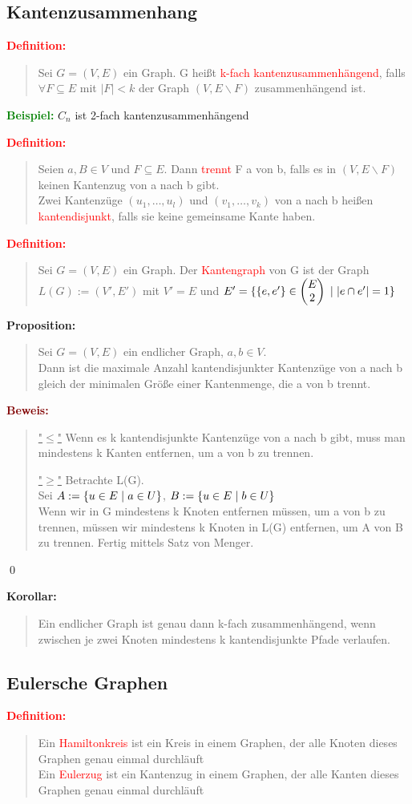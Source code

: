 \documentclass{article}
\newcommand{\smsp}{\phantom{\hspace{3px}}}
\newcommand{\red}[1]{\textcolor{red}{#1}}
\newcommand{\green}[1]{\textcolor{green}{#1}}
\newcommand{\dgr}[1]{\textcolor{dgr}{#1}}
\newcommand{\maroon}[1]{\textcolor{maroon}{#1}}
\newcommand{\ex}{\green{\textbf{Beispiel: }}}
\newcommand{\de}[1]{\red{\textbf{Definition: }}\begin{quote}#1\end{quote}}
\newcommand{\prop}[1]{\dgr{\textbf{Proposition: }}\begin{quote}#1\end{quote}}
\newcommand{\co}[1]{\dgr{\textbf{Korollar: }}\begin{quote}#1\end{quote}}
\newcommand{\pr}[1]{\maroon{\textbf{Beweis: }}\begin{quote}#1\end{quote}\qed}
\renewcommand{\st}{\smsp | \smsp}
\newcommand{\vvec}[2]{\begin{pmatrix}#1\\#2\end{pmatrix}}
\newcommand{\bs}{\backslash}
\begin{document}
\subsection{Kantenzusammenhang}

\de{
    Sei $G=(V,E)$ ein Graph. G heißt \red{k-fach kantenzusammenhängend}, falls $\forall F \subseteq E$ mit $|F| < k$ der Graph $(V, E \bs F)$ zusammenhängend ist.
}

\ex $C_n$ ist 2-fach kantenzusammenhängend

\newpage
\de{
    Seien $a,B \in V$ und $F \subseteq E$. Dann \red{trennt} F a von b, falls es in $(V, E \bs F)$ keinen Kantenzug von a nach b gibt.\\
    Zwei Kantenzüge $(u_1, \dots, u_l)$ und $(v_1, \dots, v_k)$ von a nach b heißen \red{kantendisjunkt}, falls sie keine gemeinsame Kante haben.
}

\de{
    Sei $G=(V,E)$ ein Graph. Der \red{Kantengraph} von G ist der Graph $L(G) := (V',E')$ mit $V' = E$ und $E' = \{\{e,e'\} \in \vvec{E}{2} \st |e \cap e'| = 1\}$
}

\prop{
    Sei $G=(V,E)$ ein endlicher Graph, $a,b \in V$.\\
    Dann ist die maximale Anzahl kantendisjunkter Kantenzüge von a nach b gleich der minimalen Größe einer Kantenmenge, die a von b trennt.
}

\pr{
    \underline{"$\le$"} Wenn es k kantendisjunkte Kantenzüge von a nach b gibt, muss man mindestens k Kanten entfernen, um a von b zu trennen.

    \underline{"$\ge$"} Betrachte L(G).\\
    Sei $A := \{u \in E \st a \in U\}$, $B := \{u \in E \st b \in U\}$\\
    Wenn wir in G mindestens k Knoten entfernen müssen, um a von b zu trennen, müssen wir mindestens k Knoten in L(G) entfernen, um A von B zu trennen. Fertig mittels Satz von Menger.
}

\co{
    Ein endlicher Graph ist genau dann k-fach zusammenhängend, wenn zwischen je zwei Knoten mindestens k kantendisjunkte Pfade verlaufen.
}

\subsection{Eulersche Graphen}

\de{
    Ein \red{Hamiltonkreis} ist ein Kreis in einem Graphen, der alle Knoten dieses Graphen genau einmal durchläuft\\
    Ein \red{Eulerzug} ist ein Kantenzug in einem Graphen, der alle Kanten dieses Graphen genau einmal durchläuft
}
\end{document}
